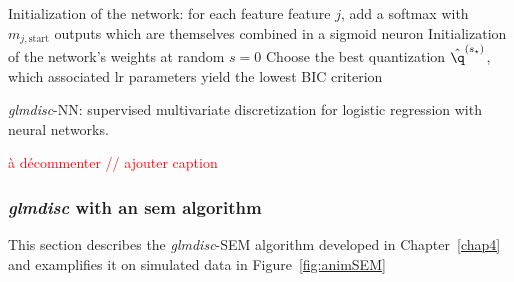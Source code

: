 \begin{algorithm}[H]
 Initialization of the network: for each feature feature $j$, add a softmax with $m_{j,\text{start}}$ outputs which are themselves combined in a sigmoid neuron\;
 Initialization of the network's weights at random\;
 $s = 0$\;
 Choose the best quantization $\hat{\q}^{(s_\star)}$, which associated \gls{lr} parameters yield the lowest BIC criterion\;
 \caption{\label{NN-disc} \textit{glmdisc}-NN: supervised multivariate discretization for logistic regression with neural networks.}
\end{algorithm}



\textcolor{red}{à décommenter // ajouter caption}

\subsubsection{\textit{glmdisc} with an \gls{sem} algorithm} \label{app1:glmdiscSEM}

This section describes the \textit{glmdisc}-SEM algorithm developed in Chapter~\ref{chap4} and examplifies it on simulated data in Figure~\ref{fig:animSEM}

